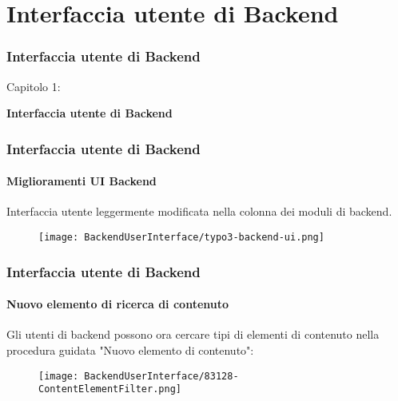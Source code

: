 %

\section{Interfaccia utente di Backend}
\begin{frame}[fragile]
	\frametitle{Interfaccia utente di Backend}

	\begin{center}\huge{Capitolo 1:}\end{center}
	\begin{center}\huge{\color{typo3darkgrey}\textbf{Interfaccia utente di Backend}}\end{center}

\end{frame}


\begin{frame}[fragile]
	\frametitle{Interfaccia utente di Backend}
	\framesubtitle{Miglioramenti UI Backend}

	Interfaccia utente leggermente modificata nella colonna dei moduli di backend.

	\begin{figure}
		\texttt{[image: BackendUserInterface/typo3-backend-ui.png]}
	\end{figure}

\end{frame}


\begin{frame}[fragile]
	\frametitle{Interfaccia utente di Backend}
	\framesubtitle{Nuovo elemento di ricerca di contenuto}

	Gli utenti di backend possono ora cercare tipi di elementi di contenuto nella procedura guidata "Nuovo elemento di contenuto":

	\begin{figure}
		\texttt{[image: BackendUserInterface/83128-ContentElementFilter.png]}
	\end{figure}

\end{frame}


